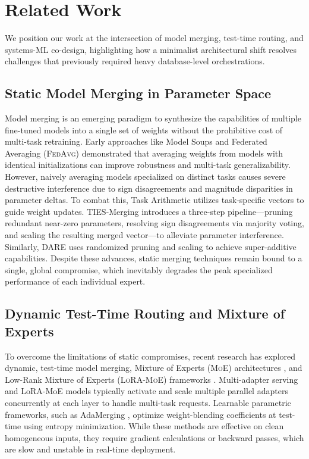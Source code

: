 \section{Related Work}
\label{sec:related_work}

We position our work at the intersection of model merging, test-time routing, and systems-ML co-design, highlighting how a minimalist architectural shift resolves challenges that previously required heavy database-level orchestrations.

\subsection{Static Model Merging in Parameter Space}
Model merging is an emerging paradigm to synthesize the capabilities of multiple fine-tuned models into a single set of weights without the prohibitive cost of multi-task retraining. Early approaches like Model Soups \cite{wortsman2022robust} and Federated Averaging (\textsc{FedAvg}) \cite{mcmahan2017communication, wang2020federated} demonstrated that averaging weights from models with identical initializations can improve robustness and multi-task generalizability. However, naively averaging models specialized on distinct tasks causes severe destructive interference due to sign disagreements and magnitude disparities in parameter deltas. To combat this, Task Arithmetic \cite{ilharco2022editing} utilizes task-specific vectors to guide weight updates. \textsc{TIES}-Merging \cite{yadav2023ties} introduces a three-step pipeline—pruning redundant near-zero parameters, resolving sign disagreements via majority voting, and scaling the resulting merged vector—to alleviate parameter interference. Similarly, \textsc{DARE} \cite{yu2023language} uses randomized pruning and scaling to achieve super-additive capabilities. Despite these advances, static merging techniques remain bound to a single, global compromise, which inevitably degrades the peak specialized performance of each individual expert.

\subsection{Dynamic Test-Time Routing and Mixture of Experts}
To overcome the limitations of static compromises, recent research has explored dynamic, test-time model merging, Mixture of Experts (\textsc{MoE}) architectures \cite{shazeer2017outrageously, fedus2021switch}, and Low-Rank Mixture of Experts (\textsc{LoRA}-\textsc{MoE}) frameworks \cite{pfeiffer2020adapterhub}. Multi-adapter serving and LoRA-MoE models typically activate and scale multiple parallel adapters concurrently at each layer to handle multi-task requests. Learnable parametric frameworks, such as AdaMerging \cite{yang2023adamerging}, optimize weight-blending coefficients at test-time using entropy minimization. While these methods are effective on clean homogeneous inputs, they require gradient calculations or backward passes, which are slow and unstable in real-time deployment. 


